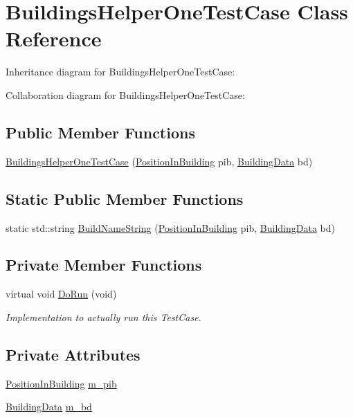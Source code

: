 \hypertarget{classBuildingsHelperOneTestCase}{}\section{Buildings\+Helper\+One\+Test\+Case Class Reference}
\label{classBuildingsHelperOneTestCase}


Inheritance diagram for Buildings\+Helper\+One\+Test\+Case\+:


Collaboration diagram for Buildings\+Helper\+One\+Test\+Case\+:
\subsection*{Public Member Functions}
\begin{DoxyCompactItemize}
\item 
\hyperlink{classBuildingsHelperOneTestCase_acaca311944ac2bbec3df4669405535af}{Buildings\+Helper\+One\+Test\+Case} (\hyperlink{structPositionInBuilding}{Position\+In\+Building} pib, \hyperlink{structBuildingData}{Building\+Data} bd)
\end{DoxyCompactItemize}
\subsection*{Static Public Member Functions}
\begin{DoxyCompactItemize}
\item 
static std\+::string \hyperlink{classBuildingsHelperOneTestCase_a915febbd85fa35818c0b00b3710c7a9c}{Build\+Name\+String} (\hyperlink{structPositionInBuilding}{Position\+In\+Building} pib, \hyperlink{structBuildingData}{Building\+Data} bd)
\end{DoxyCompactItemize}
\subsection*{Private Member Functions}
\begin{DoxyCompactItemize}
\item 
virtual void \hyperlink{classBuildingsHelperOneTestCase_a8b56b4b6ac3a92ebb8e377012b32fbdd}{Do\+Run} (void)
\begin{DoxyCompactList}\small\item\em Implementation to actually run this Test\+Case. \end{DoxyCompactList}\end{DoxyCompactItemize}
\subsection*{Private Attributes}
\begin{DoxyCompactItemize}
\item 
\hyperlink{structPositionInBuilding}{Position\+In\+Building} \hyperlink{classBuildingsHelperOneTestCase_aab8bca809365d6613287ffa50e946bb2}{m\+\_\+pib}
\item 
\hyperlink{structBuildingData}{Building\+Data} \hyperlink{classBuildingsHelperOneTestCase_a4e5e58e9f67409bd4fe0a25e0ffda4bb}{m\+\_\+bd}
\end{DoxyCompactItemize}
